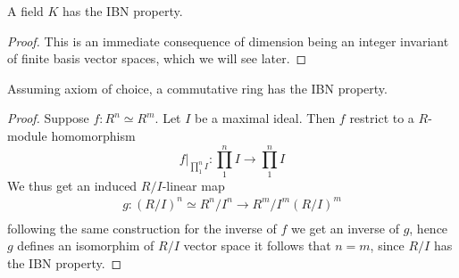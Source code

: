 \begin{lemma}
    A field $K$ has the IBN property.
\end{lemma} 
\begin{proof}
    This is an immediate consequence of dimension being an integer invariant of finite basis vector spaces, which we will see later. 
\end{proof}
\begin{proposition}
    Assuming axiom of choice, a commutative ring has the IBN property.
\end{proposition}
\begin{proof}
    Suppose $f: R^n\simeq R^m$. Let $I$ be a maximal ideal. Then $f$ restrict to a $R$-module homomorphism
    $$
        \left. f\right|_{\prod_1^n I} : \prod_1^n I\rightarrow \prod_1^n I
    $$
    We thus get an induced $R/I$-linear map
    \begin{gather*}
        g : (R/I)^n\simeq R^n/I^n \rightarrow R^m/I^m (R/I)^m\\
    \end{gather*}
    following the same construction for the inverse of $f$ we get an inverse of $g$, hence $g$ defines an isomorphim of $R/I$ vector space it follows that $n=m$, since $R/I$ has the IBN property.  
\end{proof}

